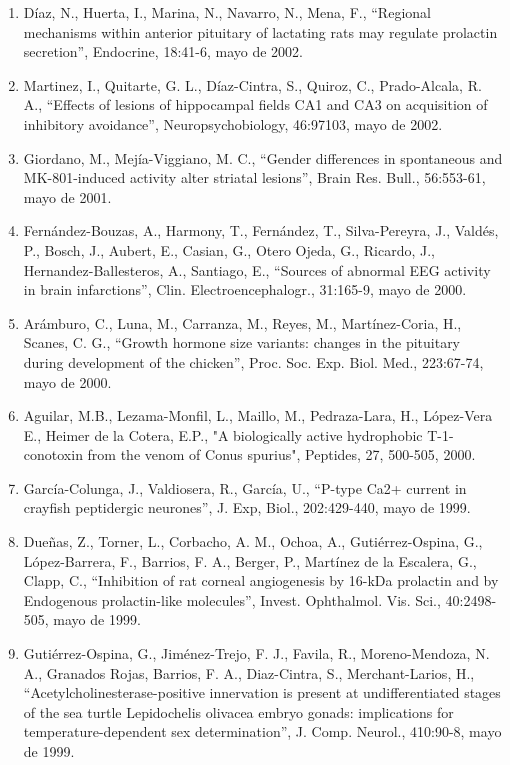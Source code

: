 \begin{enumerate}
\item Díaz, N., Huerta, I., Marina, N., Navarro, N., Mena, F., “Regional mechanisms within anterior pituitary of lactating 
rats may regulate prolactin secretion”, Endocrine, 18:41-6, mayo de 2002.

\item Martinez, I., Quitarte, G. L., Díaz-Cintra, S., Quiroz, C., Prado-Alcala, R. A., “Effects of lesions of hippocampal 
fields CA1 and CA3 on acquisition of inhibitory avoidance”, Neuropsychobiology, 46:97103, mayo de 2002.

\item Giordano, M., Mejía-Viggiano, M. C., “Gender differences in spontaneous and MK-801-induced activity alter striatal 
lesions”, Brain Res. Bull., 56:553-61, mayo de 2001.

\item Fernández-Bouzas, A., Harmony, T., Fernández, T., Silva-Pereyra, J., Valdés, P., Bosch, J., Aubert, E., Casian, G., 
Otero Ojeda, G., Ricardo, J., Hernandez-Ballesteros, A., Santiago, E., “Sources of abnormal EEG activity in brain 
infarctions”, Clin. Electroencephalogr., 31:165-9, mayo de 2000.

\item Arámburo, C., Luna, M., Carranza, M., Reyes, M., Martínez-Coria, H., Scanes, C. G., “Growth hormone size variants: 
changes in the pituitary during development of the chicken”, Proc. Soc. Exp. Biol. Med., 223:67-74, mayo de 2000.

\item Aguilar, M.B., Lezama-Monfil, L., Maillo, M., Pedraza-Lara, H., López-Vera E., Heimer de la Cotera, E.P., "A 
biologically active hydrophobic T-1-conotoxin from the venom of Conus spurius", Peptides, 27, 500-505, 2000.

\item García-Colunga, J., Valdiosera, R., García, U., “P-type Ca2+ current in crayfish peptidergic neurones”, J. Exp, 
Biol., 
202:429-440, mayo de 1999.

\item Dueñas, Z., Torner, L., Corbacho, A. M., Ochoa, A., Gutiérrez-Ospina, G., López-Barrera, F., Barrios, F. A., Berger, 
P., Martínez de la Escalera, G., Clapp, C., “Inhibition of rat corneal angiogenesis by 16-kDa prolactin and by Endogenous 
prolactin-like molecules”, Invest. Ophthalmol. Vis. Sci., 40:2498-505, mayo de 1999.

\item Gutiérrez-Ospina, G., Jiménez-Trejo, F. J., Favila, R., Moreno-Mendoza, N. A., Granados Rojas, Barrios, F. A., 
Diaz-Cintra, S., Merchant-Larios, H., “Acetylcholinesterase-positive innervation is present at undifferentiated stages of 
the sea turtle Lepidochelis olivacea embryo gonads: implications for temperature-dependent sex determination”, J. Comp. 
Neurol., 410:90-8, mayo de 1999.


\end{enumerate}
